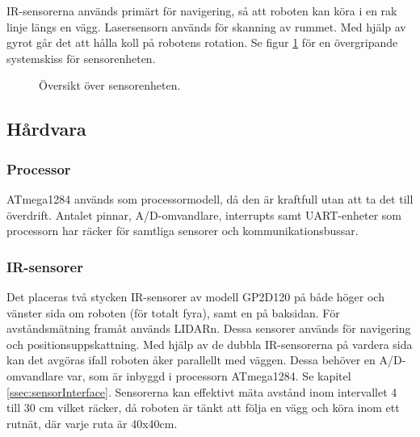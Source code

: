 \documentclass[a4paper,11pt]{article}
\begin{document}
IR-sensorerna används primärt för navigering, så att roboten kan köra i en rak linje längs en vägg. Lasersensorn används för skanning av rummet. Med hjälp av gyrot går det att hålla koll på robotens rotation.
Se figur \ref{fig:unitSensor} för en övergripande systemskiss för sensorenheten.

\begin{figure}[h!]
	\caption{Översikt över sensorenheten.}
	\label{fig:unitSensor}
\end{figure}

\subsection{Hårdvara}

\subsubsection{Processor}
ATmega1284 används som processormodell, då den är kraftfull utan att ta det till överdrift. Antalet pinnar, A/D-omvandlare, interrupts samt UART-enheter som processorn har räcker för samtliga sensorer och kommunikationsbussar.

\subsubsection{IR-sensorer} \label{sssec:sonicsensors}
Det placeras två stycken IR-sensorer av modell GP2D120 på både höger och vänster sida om roboten (för totalt fyra), samt en på baksidan. För avståndsmätning framåt används LIDARn. Dessa sensorer används för navigering och positionsuppskattning. Med hjälp av de dubbla IR-sensorerna på vardera sida kan det avgöras ifall roboten åker parallellt med väggen. Dessa behöver en A/D-omvandlare var, som är inbyggd i processorn ATmega1284. Se kapitel \ref{ssec:sensorInterface}. Sensorerna kan effektivt mäta avstånd inom intervallet 4 till 30 cm vilket räcker, då roboten är tänkt att följa en vägg och köra inom ett rutnät, där varje ruta är 40x40cm.
\end{document}
